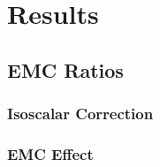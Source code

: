 
\chapter{Results}

\section{EMC Ratios}

\subsection{Isoscalar Correction}
\subsection{EMC Effect}


